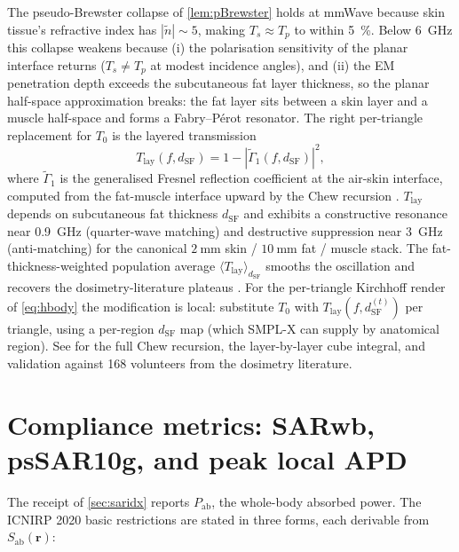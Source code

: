 \documentclass[11pt,a4paper]{article}
\theoremstyle{definition}
\newcommand{\rr}{\mathbf{r}}
\newcommand{\Sab}{S_{\mathrm{ab}}}
\newcommand{\Pabs}{P_{\mathrm{ab}}}
\begin{document}
The pseudo-Brewster collapse of \cref{lem:pBrewster} holds at
mmWave because skin tissue's refractive index has $|\tilde n|\sim 5$,
making $T_s\approx T_p$ to within \SI{5}{\percent}.  Below
\SI{6}{\GHz} this collapse weakens because (i) the polarisation
sensitivity of the planar interface returns ($T_s\ne T_p$ at
modest incidence angles), and (ii) the EM penetration depth
exceeds the subcutaneous fat layer thickness, so the planar
half-space approximation breaks: the fat layer sits between a
skin layer and a muscle half-space and forms a Fabry--P\'erot
resonator.  The right per-triangle replacement for $T_0$ is the
layered transmission
\begin{equation}\label{eq:T-lay}
  T_{\mathrm{lay}}(f,d_{\mathrm{SF}})
  = 1-|\tilde\Gamma_1(f,d_{\mathrm{SF}})|^2,
\end{equation}
where $\tilde\Gamma_1$ is the generalised Fresnel reflection
coefficient at the air-skin interface, computed from the
fat-muscle interface upward by the Chew recursion
\cite{Chew1995}.  $T_{\mathrm{lay}}$ depends on subcutaneous fat
thickness $d_{\mathrm{SF}}$ and exhibits a constructive resonance
near \SI{0.9}{\GHz} (quarter-wave matching) and destructive
suppression near \SI{3}{\GHz} (anti-matching) for the canonical
$\SI{2}{\milli\m}$ skin / $\SI{10}{\milli\m}$ fat / muscle stack.
The fat-thickness-weighted population average
$\langle T_{\mathrm{lay}}\rangle_{d_{\mathrm{SF}}}$ smooths the
oscillation and recovers the dosimetry-literature
plateaus
\cite{Flintoft2014,Zhang2017thesis}.  For the per-triangle
Kirchhoff render of \cref{eq:hbody} the modification is local:
substitute $T_0$ with $T_{\mathrm{lay}}(f,d_{\mathrm{SF}}^{(t)})$
per triangle, using a per-region $d_{\mathrm{SF}}$ map (which
SMPL-X can supply by anatomical region).  See
\cite{WydaegheTAP2025} for the full Chew recursion, the
layer-by-layer cube integral, and validation against \num{168}
volunteers from the dosimetry literature.

\section{Compliance metrics: SARwb, psSAR10g, and peak local APD}\label{sec:compliance-metrics}

The receipt of \cref{sec:saridx} reports $\Pabs$, the whole-body
absorbed power.  The ICNIRP 2020 basic restrictions
\cite{ICNIRP2020} are stated in three forms, each derivable from
$\Sab(\rr)$:
\end{document}
